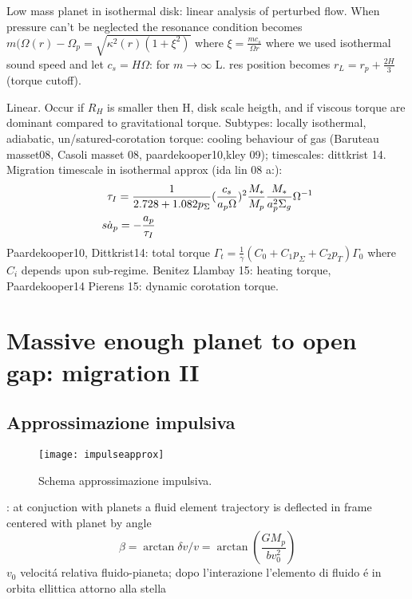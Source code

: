 \begin{workout}
Low mass planet in isothermal disk: linear analysis of perturbed flow.
When pressure can't be neglected the resonance condition becomes $m(\Omega(r)-\Omega_p=\sqrt{\kappa^2(r)(1+\xi^2)}$ where $\xi=\frac{mc_s}{\Omega r}$ where we used isothermal sound speed and let $c_s=H\Omega$: for $m\to\infty$ L. res position becomes $r_L=r_p+\frac{2H}{3}$ (torque cutoff).

Linear. Occur if $R_H$ is smaller then H, disk scale heigth, and if viscous torque are dominant compared to gravitational torque.
Subtypes: locally isothermal, adiabatic, un/satured-corotation torque: cooling behaviour of gas (Baruteau masset08, Casoli masset 08, paardekooper10,kley 09); timescales: dittkrist 14.
Migration timescale in isothermal approx (ida lin 08 a:):
\begin{align*}
&\tau_I=\frac{1}{2.728+1.082p_{\Sigma}}(\frac{c_s}{a_p\Omega})^2\frac{M_*}{M_p}\frac{M_*}{a_p^2\Sigma_g}\Omega^{-1}\\
s&\dot{a}_p=-\frac{a_p}{\tau_I}
\end{align*}
Paardekooper10, Dittkrist14: total torque $\Gamma_t=\frac{1}{\gamma}(C_0+C_1p_{\Sigma}+C_2p_T)\Gamma_0$ where $C_i$ depends upon sub-regime.
Benitez Llambay 15: heating torque, Paardekooper14 Pierens 15: dynamic corotation torque.
\end{workout}

\section{Massive enough planet to open gap: migration II}

\subsection{Approssimazione impulsiva}
\begin{wrapfigure}[14]{l}{0.45\textwidth}
\texttt{[image: impulseapprox]}\label{fig:impulseapprox}
\caption{Schema approssimazione impulsiva.}
\end{wrapfigure}

: at conjuction with planets a fluid element trajectory is deflected in frame centered with planet by angle
\begin{equation}
\beta=\arctan{\delta v/v}=\arctan{(\frac{GM_p}{bv_0^2})}
\end{equation}
$v_0$ velocit\'a relativa fluido-pianeta; dopo l'interazione l'elemento di fluido \'e in orbita ellittica attorno alla stella

